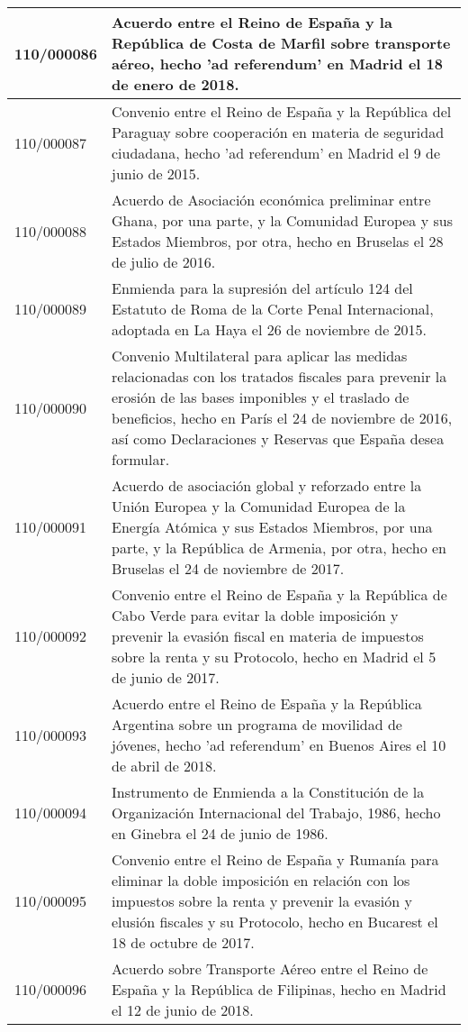 {\begin{table}[H]
\begin{center}
\begin{tabularx}{\linewidth}{| l | X |}
\hline
110/000086 & Acuerdo entre el Reino de España y la República de Costa de Marfil sobre transporte aéreo, hecho 'ad referendum' en Madrid el 18 de enero de 2018. \\
\hline
110/000087 & Convenio entre el Reino de España y la República del Paraguay sobre cooperación en materia de seguridad ciudadana, hecho 'ad referendum' en Madrid el 9 de junio de 2015. \\
\hline
110/000088 & Acuerdo de Asociación económica preliminar entre Ghana, por una parte, y la Comunidad Europea y sus Estados Miembros, por otra, hecho en Bruselas el 28 de julio de 2016. \\
\hline
110/000089 & Enmienda para la supresión del artículo 124 del Estatuto de Roma de la Corte Penal Internacional, adoptada en La Haya el 26 de noviembre de 2015. \\
\hline
110/000090 & Convenio Multilateral para aplicar las medidas relacionadas con los tratados fiscales para prevenir la erosión de las bases imponibles y el traslado de beneficios, hecho en París el 24 de noviembre de 2016, así como Declaraciones y Reservas que España desea formular. \\
\hline
110/000091 & Acuerdo de asociación global y reforzado entre la Unión Europea y la Comunidad Europea de la Energía Atómica y sus Estados Miembros, por una parte, y la República de Armenia, por otra, hecho en Bruselas el 24 de noviembre de 2017. \\
\hline
110/000092 & Convenio entre el Reino de España y la República de Cabo Verde para evitar la doble imposición y prevenir la evasión fiscal en materia de impuestos sobre la renta y su Protocolo, hecho en Madrid el 5 de junio de 2017. \\
\hline
110/000093 & Acuerdo entre el Reino de España y la República Argentina sobre un programa de movilidad de jóvenes, hecho 'ad referendum' en Buenos Aires el 10 de abril de 2018. \\
\hline
110/000094 & Instrumento de Enmienda a la Constitución de la Organización Internacional del Trabajo, 1986, hecho en Ginebra el 24 de junio de 1986. \\
\hline
110/000095 & Convenio entre el Reino de España y Rumanía para eliminar la doble imposición en relación con los impuestos sobre la renta y prevenir la evasión y elusión fiscales y su Protocolo, hecho en Bucarest el 18 de octubre de 2017. \\
\hline
110/000096 & Acuerdo sobre Transporte Aéreo entre el Reino de España y la República de Filipinas, hecho en Madrid el 12 de junio de 2018. \\

\end{tabularx}
\end{center}
\end{table}}
